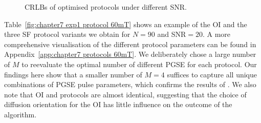 \begin{figure}[H]
	\centering
	
	\caption{CRLBs of optimised protocols under different SNR.}
	\label{fig:chapter7 exp1 SNR vs CRLB}
\end{figure}
Table~\ref{fig:chapter7 exp1 protocol 60mT} shows an example of the \gls{OI}{} and the three \gls{SF}{} protocol variants we obtain for $N=90$ and SNR$=20$. A more comprehensive visualisation of the different protocol parameters can be found in Appendix~\ref{app:chapter7 protocols 60mT}. We deliberately chose a large number of $M$ to reevaluate the optimal number of different PGSE for each protocol. Our findings here show that a smaller number of $M=4$ suffices to capture all unique combinations of PGSE pulse parameters, which confirms the results of \citet{Alexander:2008}. We also note that {\gls{OI}} and {\SD} protocols are almost identical, suggesting that the choice of diffusion orientation for the {\gls{OI}} has little influence on the outcome of the algorithm.
